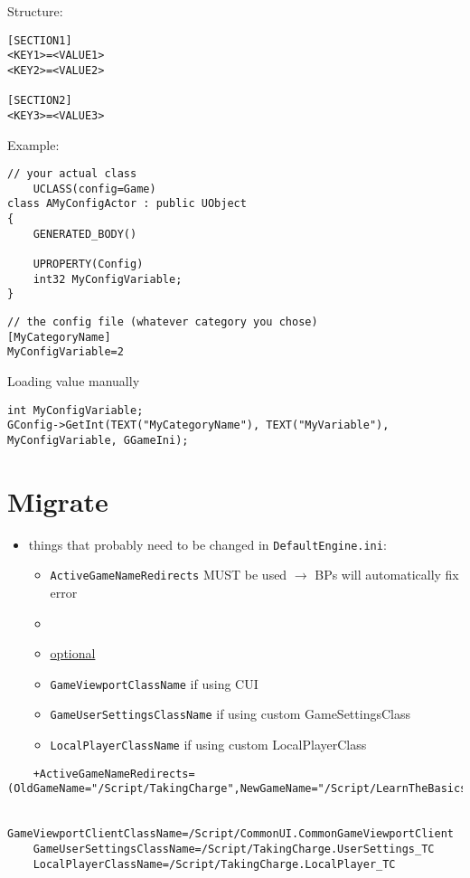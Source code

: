 \documentclass{scrbook}
\newcommand{\code}[1]{\colorbox{mygray}{\lstinline|#1|}}
\begin{document}
            

Structure:
\begin{lstlisting}
[SECTION1]
<KEY1>=<VALUE1>
<KEY2>=<VALUE2>
    
[SECTION2]
<KEY3>=<VALUE3>
\end{lstlisting}
Example:
\begin{lstlisting}
// your actual class
    UCLASS(config=Game)
class AMyConfigActor : public UObject
{
    GENERATED_BODY()
    
    UPROPERTY(Config)
    int32 MyConfigVariable;
}
\end{lstlisting}
\begin{lstlisting}
// the config file (whatever category you chose)
[MyCategoryName]
MyConfigVariable=2
\end{lstlisting}

Loading value manually
\begin{lstlisting}
int MyConfigVariable;
GConfig->GetInt(TEXT("MyCategoryName"), TEXT("MyVariable"), MyConfigVariable, GGameIni);
\end{lstlisting}


        \section{Migrate}
            \begin{itemize}
                \item things that probably need to be changed in \code{DefaultEngine.ini}:
                \begin{itemize}
                    \item \code{ActiveGameNameRedirects} MUST be used $\rightarrow$ BPs will automatically fix error
                    \item 
                    \item \uline{optional}
                    \item \code{GameViewportClassName} if using CUI
                    \item \code{GameUserSettingsClassName} if using custom GameSettingsClass
                    \item \code{LocalPlayerClassName} if using custom LocalPlayerClass
                \end{itemize}
            \end{itemize}
        \begin{lstlisting}
    +ActiveGameNameRedirects=(OldGameName="/Script/TakingCharge",NewGameName="/Script/LearnTheBasics")

    GameViewportClientClassName=/Script/CommonUI.CommonGameViewportClient
    GameUserSettingsClassName=/Script/TakingCharge.UserSettings_TC
    LocalPlayerClassName=/Script/TakingCharge.LocalPlayer_TC
        \end{lstlisting}    
        
\end{document}
